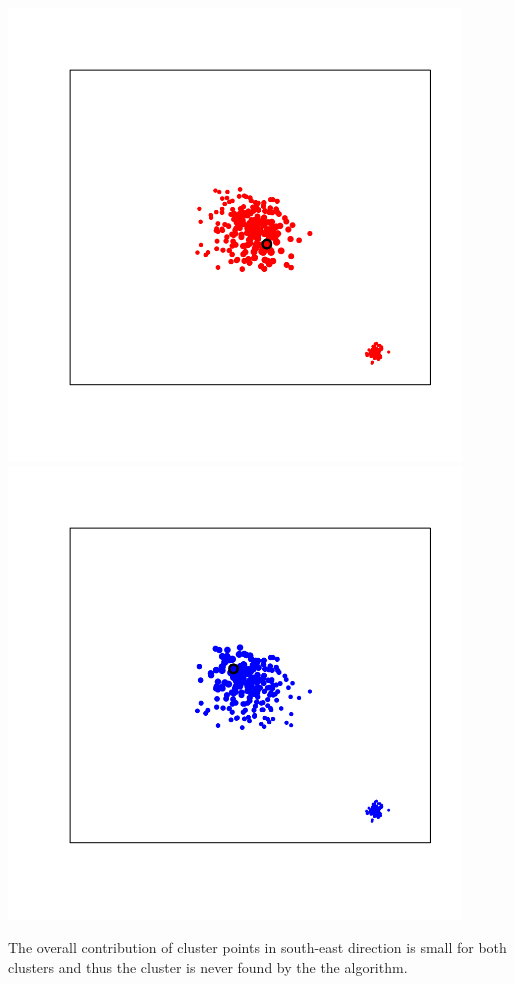 \documentclass[landscape,footrule]{foils}
\begin{document}
\begin{center}
\includegraphics[width=12cm]{weighting-scheme-i-1}\hspace*{-2cm}
\includegraphics[width=12cm]{weighting-scheme-i-2}
\end{center}
\vspace*{-2cm}

The overall contribution of cluster points in south-east direction is small for both clusters and thus the cluster is never found by the the algorithm.
\end{document}
